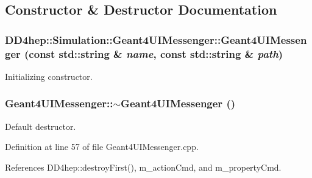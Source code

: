 \subsection{Constructor \& Destructor Documentation}
\hypertarget{class_d_d4hep_1_1_simulation_1_1_geant4_u_i_messenger_a82be43ebe3c90a3e1d6887aaa20d3196}{
\subsubsection[{Geant4UIMessenger}]{\setlength{\rightskip}{0pt plus 5cm}DD4hep::Simulation::Geant4UIMessenger::Geant4UIMessenger (const std::string \& {\em name}, \/  const std::string \& {\em path})}}
\label{class_d_d4hep_1_1_simulation_1_1_geant4_u_i_messenger_a82be43ebe3c90a3e1d6887aaa20d3196}


Initializing constructor. \hypertarget{class_d_d4hep_1_1_simulation_1_1_geant4_u_i_messenger_aad6ad70233b8f95d1cdd09661ad0d510}{
\subsubsection[{$\sim$Geant4UIMessenger}]{\setlength{\rightskip}{0pt plus 5cm}Geant4UIMessenger::$\sim$Geant4UIMessenger ()}}
\label{class_d_d4hep_1_1_simulation_1_1_geant4_u_i_messenger_aad6ad70233b8f95d1cdd09661ad0d510}


Default destructor. 

Definition at line 57 of file Geant4UIMessenger.cpp.

References DD4hep::destroyFirst(), m\_\-actionCmd, and m\_\-propertyCmd.

